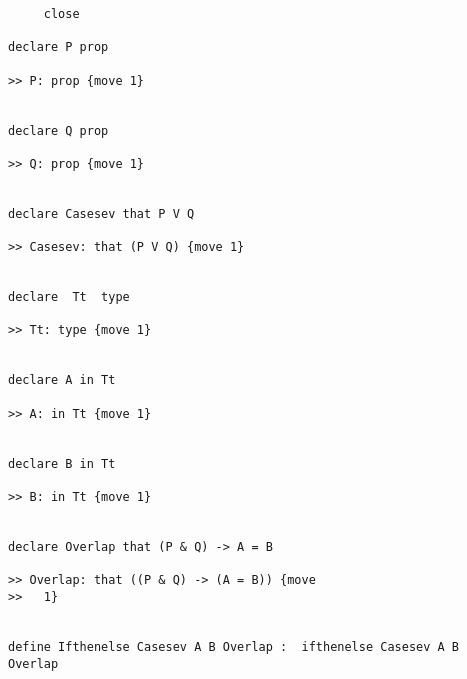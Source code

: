 \documentclass[12pt]{article}
\begin{document}
\begin{verbatim}
     close

declare P prop

>> P: prop {move 1}


declare Q prop

>> Q: prop {move 1}


declare Casesev that P V Q

>> Casesev: that (P V Q) {move 1}


declare  Tt  type

>> Tt: type {move 1}


declare A in Tt

>> A: in Tt {move 1}


declare B in Tt

>> B: in Tt {move 1}


declare Overlap that (P & Q) -> A = B

>> Overlap: that ((P & Q) -> (A = B)) {move 
>>   1}


define Ifthenelse Casesev A B Overlap :  ifthenelse Casesev A B Overlap


\end{verbatim}
\end{document}

